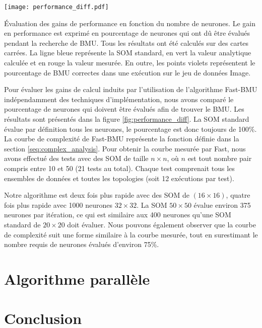 	\begin{figureth}
    	\centering
    	\texttt{[image: performance\_diff.pdf]}
    	\caption[Évaluation des gains de performance en fonction du nombre de neurones]{Évaluation des gains de performance en fonction du nombre de neurones. Le gain en performance est exprimé en pourcentage de neurones qui ont dû être évalués pendant la recherche de BMU. Tous les résultats ont été calculés sur des cartes carrées. La ligne bleue représente la SOM standard, en vert la valeur analytique calculée et en rouge la valeur mesurée. En outre, les points violets représentent le pourcentage de BMU correctes dans une exécution sur le jeu de données Image.}
    	\label{fig:performance_diff}
	\end{figureth}

	Pour évaluer les gains de calcul induits par l'utilisation de l'algorithme Fast-BMU indépendamment des techniques d'implémentation, nous avons comparé le pourcentage de neurones qui doivent être évalués afin de trouver le BMU. Les résultats sont présentés dans la figure \ref{fig:performance_diff}. La SOM standard évalue par définition tous les neurones, le pourcentage est donc toujours de 100\%. La courbe de complexité de Fast-BMU représente la fonction définie dans la section \ref{seq:complex_analysis}. Pour obtenir la courbe mesurée par Fast, nous avons effectué des tests avec des SOM de taille $n\times n$, où $n$ est tout nombre pair compris entre 10 et 50 (21 tests au total). Chaque test comprenait tous les ensembles de données et toutes les topologies (soit 12 exécutions par test).

	Notre algorithme est deux fois plus rapide avec des SOM de $(16\times16)$, quatre fois plus rapide avec 1000 neurones $32\times32$. La SOM $50\times50$ évalue environ 375 neurones par itération, ce qui est similaire aux 400 neurones qu'une SOM standard de $20\times20$ doit évaluer. Nous pouvons également observer que la courbe de complexité suit une forme similaire à la courbe mesurée, tout en surestimant le nombre requis de neurones évalués d'environ 75\%.

	\newpage
	\section{Algorithme parallèle}
	\section{Conclusion}

